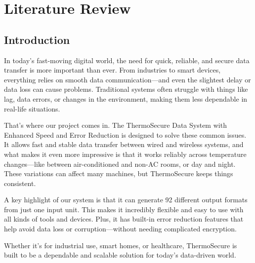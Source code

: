\documentclass[12pt]{report}
\begin{document}
\chapter{Literature Review}
\section{Introduction}
\begin{flushleft}
In today's fast-moving digital world, the need for quick, reliable, and secure data transfer is more important than ever. From industries to smart devices, everything relies on smooth data communication—and even the slightest delay or data loss can cause problems. Traditional systems often struggle with things like lag, data errors, or changes in the environment, making them less dependable in real-life situations.

That's where our project comes in. The ThermoSecure Data System with Enhanced Speed and Error Reduction is designed to solve these common issues. It allows fast and stable data transfer between wired and wireless systems, and what makes it even more impressive is that it works reliably across temperature changes—like between air-conditioned and non-AC rooms, or day and night. These variations can affect many machines, but ThermoSecure keeps things consistent.

A key highlight of our system is that it can generate 92 different output formats from just one input unit. This makes it incredibly flexible and easy to use with all kinds of tools and devices. Plus, it has built-in error reduction features that help avoid data loss or corruption—without needing complicated encryption.

Whether it's for industrial use, smart homes, or healthcare, ThermoSecure is built to be a dependable and scalable solution for today's data-driven world.
\end{flushleft}
\end{document}
